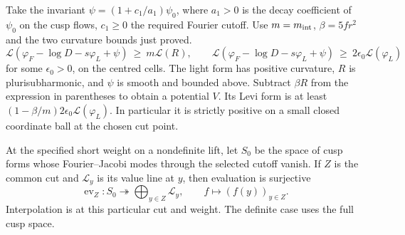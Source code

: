 Take the invariant
\(\psi=(1+c_1/a_1)\psi_0\), where \(a_1>0\) is the decay
coefficient of \(\psi_0\) on the cusp flows, \(c_1\ge0\)
the required Fourier cutoff. Use \(m=m_{\rm int}\), \(\beta=5fr^2\) and the two
curvature bounds just proved.
\[
 \mathcal L(\varphi_F-\log D-s\varphi_L+\psi)
        \ \ge\ m\mathcal L(R),\qquad
 \mathcal L(\varphi_F-\log D-s\varphi_L+\psi)
        \ \ge\ 2\epsilon_0\mathcal L(\varphi_L)
\]
for some \(\epsilon_0>0\), on the centred cells.
The light form has positive curvature, \(R\) is plurisubharmonic,
and \(\psi\) is smooth and bounded above. Subtract \(\beta R\)
from the expression in parentheses to obtain a potential
\(V\). Its Levi form is at least
\((1-\beta/m)2\epsilon_0\mathcal L(\varphi_L)\). In particular
it is strictly positive on a small closed coordinate ball
at the chosen cut point.

\begin{proposition}
\label{prop:cut-interpolation-with-cusp-gap}
At the specified short weight on a nondefinite lift, let \(S_0\) be the space of cusp forms whose Fourier--Jacobi modes through the selected cutoff vanish. If \(Z\) is the common cut and \(\mathcal L_y\) is its value line at \(y\), then evaluation is surjective
\[
 \operatorname{ev}_Z:S_0\twoheadrightarrow\bigoplus_{y\in Z}\mathcal L_y,\qquad f\longmapsto(f(y))_{y\in Z}.
\]
 Interpolation
is at this particular cut and weight. The definite case uses the
full cusp space.
\end{proposition}

